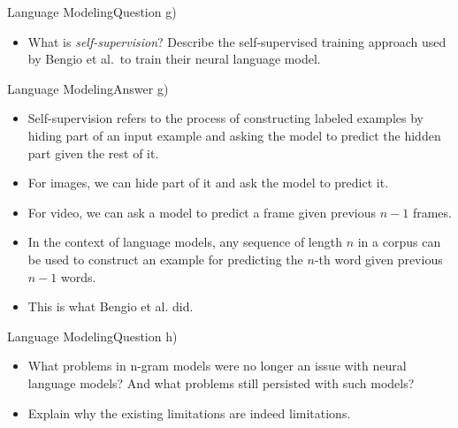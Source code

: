 \documentclass[t]{beamer}
\begin{document}
\begin{frame}{Language Modeling}{Question g)}
    \begin{itemize}
        \item What is \emph{self-supervision}? Describe the self-supervised
              training approach used by Bengio et al.\ to train their neural
              language model.
    \end{itemize}
\end{frame}

\begin{frame}{Language Modeling}{Answer g)}
    \begin{itemize}
        \item Self-supervision refers to the process of constructing labeled
              examples by hiding part of an input example and asking the model
              to predict the hidden part given the rest of it.
        \item For images, we can hide part of it and ask the model to predict
              it.
        \item For video, we can ask a model to predict a frame given previous
              $n-1$ frames.
        \item In the context of language models, any sequence of length $n$ in a
              corpus can be used to construct an example for predicting the
              $n$-th word given previous $n-1$ words.
        \item This is what Bengio et al. did.
    \end{itemize}
\end{frame}

\begin{frame}{Language Modeling}{Question h)}
    \begin{itemize}
        \item What problems in n-gram models were no longer an issue with neural
              language models? And what problems still persisted with such
              models?
        \item Explain why the existing limitations are indeed limitations.
    \end{itemize}
\end{frame}
\end{document}
